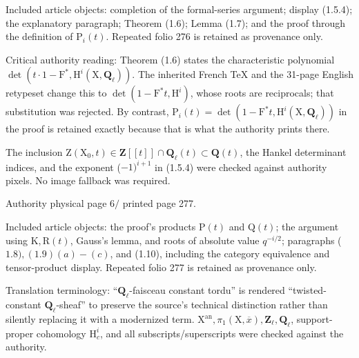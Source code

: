 \documentclass[10pt,leqno]{article}
\begin{document}
\noindent Included article objects: completion of the formal-series argument; display (1.5.4); the explanatory paragraph; Theorem (1.6); Lemma (1.7); and the proof through the definition of \(\mathrm{P}_{i}(t)\). Repeated folio 276 is retained as provenance only.\par

\noindent Critical authority reading: Theorem (1.6) states the characteristic polynomial \(\operatorname{det}(t\cdot 1- \mathrm{F}^{*},\mathrm{H}^{i}(\mathrm{X},\mathbf{Q}_{\ell }))\). The inherited French TeX and the 31-page English retypeset change this to \(\operatorname{det}(1- \mathrm{F}^{*}t,\mathrm{H}^{i})\), whose roots are reciprocals; that substitution was rejected. By contrast, \(\mathrm{P}_{i}(t)=\operatorname{det}(1- \mathrm{F}^{*}t,\mathrm{H}^{i}(\mathrm{X},\mathbf{Q}_{\ell }))\) in the proof is retained exactly because that is what the authority prints there.\par

\noindent The inclusion \(\mathrm{Z}(\mathrm{X}_{0},t)\in \mathbf{Z}[[t]]\cap \mathbf{Q}_{\ell }(t)\subset \mathbf{Q}(t)\), the Hankel determinant indices, and the exponent (\(- 1)^{i+1}\) in (1.5.4) were checked against authority pixels. No image fallback was required.\par

\clearpage

\label{physical-6}\par\smallskip

\noindent Authority physical page \(6 /\) printed page 277.\par

\noindent Included article objects: the proof’s products \(\mathrm{P}(t)\) and \(\mathrm{Q}(t)\); the argument using \(\mathrm{K}, \mathrm{R}(t)\), Gauss’s lemma, and roots of absolute value \(q^{- i/2}\); paragraphs (\(1.8), (1.9)(a)-(c)\), and (1.10), including the category equivalence and tensor-product display. Repeated folio 277 is retained as provenance only.\par

\noindent Translation terminology: “\(\mathbf{Q}_{\ell }\)-faisceau constant tordu” is rendered “twisted-constant \(\mathbf{Q}_{\ell }\)-sheaf” to preserve the source’s technical distinction rather than silently replacing it with a modernized term. \(\mathrm{X}^{\mathrm{an}}, \pi _{1}(\mathrm{X},\overline{x}), \mathbf{Z}_{\ell }, \mathbf{Q}_{\ell }\), support-proper cohomology \(\mathrm{H}_{c}^{i}\), and all subscripts/superscripts were checked against the authority.\par
\end{document}
